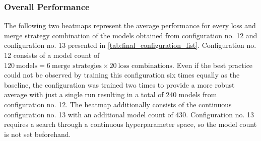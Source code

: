 \subsubsection*{Overall Performance}
\label{subsubsec:idrid_overall_performance}
The following two heatmaps represent the average performance for every loss and merge strategy combination of the models obtained from configuration no. 12 and configuration no. 13 presented in \ref{tab:final_configuration_list}. Configuration no. 12 consists of a model count of $120\:\text{models} = 6\:\text{merge strategies} \times20\:\text{loss combinations}$. Even if the best practice could not be observed by training this configuration six times equally as the baseline, the configuration was trained two times to provide a more robust average with just a single run resulting in a total of 240 models from configuration no. 12. The heatmap additionally consists of the continuous configuration no. 13 with an additional model count of 430. Configuration no. 13 requires a search through a continuous hyperparameter space, so the model count is not set beforehand.

